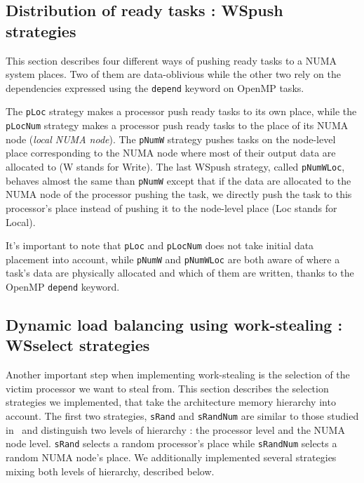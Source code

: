 \documentclass{Styles/llncs}
\begin{document}
\subsection{Distribution of ready tasks : WSpush strategies}

This section describes four different ways of pushing ready tasks to a NUMA system places.
Two of them are data-oblivious while the other two rely on the dependencies expressed using the \verb!depend! keyword on OpenMP tasks.

The \verb/pLoc/ strategy makes a processor push ready tasks to
    its own place, while the \verb/pLocNum/ strategy makes a processor push ready tasks to the place of its NUMA node (\emph{local NUMA node}).
The \verb/pNumW/ strategy pushes tasks on the node-level place corresponding to the NUMA node where most of their output data are allocated to (W stands for Write).
The last WSpush strategy, called \verb/pNumWLoc/, behaves almost the same than \verb!pNumW! except that if
    the data are allocated to the NUMA node of the processor pushing the task, we directly push the task to this processor's place instead of pushing it to the node-level place (Loc stands for Local).
    
    It's important to note that \verb!pLoc! and \verb!pLocNum! does not take initial data placement into account, while \verb!pNumW! and \verb!pNumWLoc! are both aware of where a task's data are physically allocated and which of them are written, thanks to the OpenMP \verb!depend! keyword.

\subsection{Dynamic load balancing using work-stealing : WSselect strategies}

Another important step when implementing work-stealing is the selection of the victim processor we want to steal from.
This section describes the selection strategies we implemented, that take the architecture memory hierarchy into account.
The first two strategies, \verb!sRand! and \verb!sRandNum! are similar to those studied in~\cite{DBLP:journals/ijhpca/OlivierPWSP12}
and distinguish two levels of hierarchy : the processor level and the NUMA node level.
\verb/sRand/ selects a random processor's place while \verb/sRandNum/ selects a random NUMA node's place.
We additionally implemented several strategies mixing both levels of hierarchy,
described below.
\end{document}
